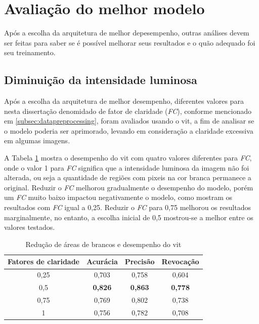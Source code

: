 \section{Avaliação do melhor modelo}\label{sec:bestmodel}

Após a escolha da arquitetura de melhor depesempenho, outras análises devem ser feitas para saber se é possível melhorar seus resultados e o quão adequado foi seu treinamento.

\subsection{Diminuição da intensidade luminosa}
Após a escolha da arquitetura de melhor desempenho, diferentes valores para nesta dissertação denomidado de fator de claridade (\textit{FC}), conforme mencionado em \ref{subsec:datapreprocessing}, foram avaliados usando o \acrshort{vit}, a fim de analisar se o modelo poderia ser aprimorado, levando em consideração a claridade excessiva em algumas imagens.

A Tabela \ref{tab:brightnessfactor} mostra o desempenho do \acrshort{vit} com quatro valores diferentes para \textit{FC}, onde o valor 1 para \textit{FC} significa que a intensidade luminosa da imagem não foi alterada, ou seja a quantidade de regiões com pixeis na cor branca permanece a original. 
Reduzir o \textit{FC} melhorou gradualmente o desempenho do modelo, porém um \textit{FC} muito baixo impactou negativamente o modelo, como mostram os resultados com \textit{FC} igual a 0,25. Reduzir o \textit{FC} para 0,75 melhorou os resultados marginalmente, no entanto, a escolha inicial de 0,5 mostrou-se a melhor entre os valores testados.

\begin{table}[tb]
\caption{\label{tab:brightnessfactor} Redução de áreas de brancos e desempenho do \acrshort{vit}}
\begin{center}
\begin{tabular}{c|ccc}
\toprule
 Fatores de claridade & Acurácia &  Precisão  & Revocação \\
\midrule
     0,25 & 0,703 & 0,758 & 0,604 \\
     0,5 & \textbf{0,826} & \textbf{0,863} & \textbf{0,778} \\
     0,75 & 0,769 & 0,802 & 0,738 \\
     1 & 0,756 & 0,782 & 0,708 \\
\bottomrule
\end{tabular}
\end{center}
\end{table}

